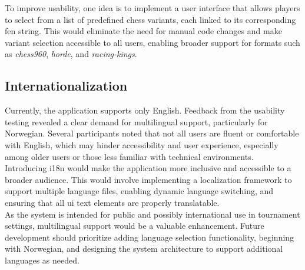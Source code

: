To improve usability, one idea is to implement a user interface that allows players to select from a list of predefined chess variants, each linked to its corresponding \gls{fen} string. This would eliminate the need for manual code changes and make variant selection accessible to all users, enabling broader support for formats such as \textit{\gls{chess960}}, \textit{\gls{horde}}, and \textit{\gls{racing-kings}}.

\subsection{Internationalization}
Currently, the application supports only English. Feedback from the usability testing revealed a clear demand for multilingual support, particularly for Norwegian. Several participants noted that not all users are fluent or comfortable with English, which may hinder accessibility and user experience, especially among older users or those less familiar with technical environments. \\

Introducing \gls{i18n} would make the application more inclusive and accessible to a broader audience. This would involve implementing a localization framework to support multiple language files, enabling dynamic language switching, and ensuring that all \gls{ui} text elements are properly translatable. \\

As the system is intended for public and possibly international use in tournament settings, multilingual support would be a valuable enhancement. Future development should prioritize adding language selection functionality, beginning with Norwegian, and designing the system architecture to support additional languages as needed.
